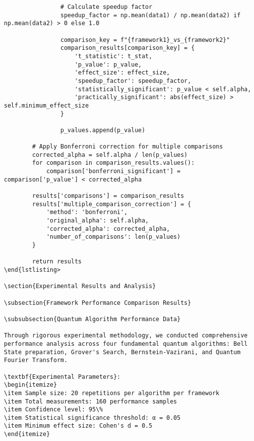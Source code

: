 \documentclass[12pt,a4paper]{report}
\begin{document}
\begin{lstlisting}
                # Calculate speedup factor
                speedup_factor = np.mean(data1) / np.mean(data2) if np.mean(data2) > 0 else 1.0

                comparison_key = f"{framework1}_vs_{framework2}"
                comparison_results[comparison_key] = {
                    't_statistic': t_stat,
                    'p_value': p_value,
                    'effect_size': effect_size,
                    'speedup_factor': speedup_factor,
                    'statistically_significant': p_value < self.alpha,
                    'practically_significant': abs(effect_size) > self.minimum_effect_size
                }

                p_values.append(p_value)

        # Apply Bonferroni correction for multiple comparisons
        corrected_alpha = self.alpha / len(p_values)
        for comparison in comparison_results.values():
            comparison['bonferroni_significant'] = comparison['p_value'] < corrected_alpha

        results['comparisons'] = comparison_results
        results['multiple_comparison_correction'] = {
            'method': 'bonferroni',
            'original_alpha': self.alpha,
            'corrected_alpha': corrected_alpha,
            'number_of_comparisons': len(p_values)
        }

        return results
\end{lstlisting>

\section{Experimental Results and Analysis}

\subsection{Framework Performance Comparison Results}

\subsubsection{Quantum Algorithm Performance Data}

Through rigorous experimental methodology, we conducted comprehensive performance analysis across four fundamental quantum algorithms: Bell State preparation, Grover's Search, Bernstein-Vazirani, and Quantum Fourier Transform.

\textbf{Experimental Parameters}:
\begin{itemize}
\item Sample size: 20 repetitions per algorithm per framework
\item Total measurements: 160 performance samples
\item Confidence level: 95\%
\item Statistical significance threshold: α = 0.05
\item Minimum effect size: Cohen's d = 0.5
\end{itemize}


\end{lstlisting}
\end{document}
